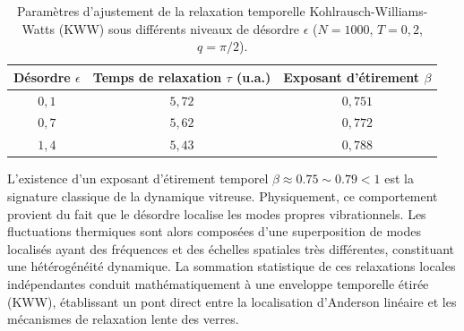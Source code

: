 \begin{table}[htbp]
    \centering
    \small
    \caption{Paramètres d'ajustement de la relaxation temporelle Kohlrausch-Williams-Watts (KWW) sous différents niveaux de désordre $\epsilon$ ($N = 1000$, $T = 0{,}2$, $q = \pi/2$).}
    \label{tab:temporal_kww_fits}
    \begin{tabular}{@{}ccc@{}}
        \toprule
        \textbf{Désordre $\epsilon$} & \textbf{Temps de relaxation $\tau$ (u.a.)} & \textbf{Exposant d'étirement $\beta$} \\
        \midrule
        $0{,}1$ & $5{,}72$ & $0{,}751$ \\
        $0{,}7$ & $5{,}62$ & $0{,}772$ \\
        $1{,}4$ & $5{,}43$ & $0{,}788$ \\
        \bottomrule
    \end{tabular}
\end{table}

L'existence d'un exposant d'étirement temporel $\beta \approx 0.75 \sim 0.79 < 1$ est la signature classique de la dynamique vitreuse. Physiquement, ce comportement provient du fait que le désordre localise les modes propres vibrationnels. Les fluctuations thermiques sont alors composées d'une superposition de modes localisés ayant des fréquences et des échelles spatiales très différentes, constituant une hétérogénéité dynamique. La sommation statistique de ces relaxations locales indépendantes conduit mathématiquement à une enveloppe temporelle étirée (KWW), établissant un pont direct entre la localisation d'Anderson linéaire et les mécanismes de relaxation lente des verres.
